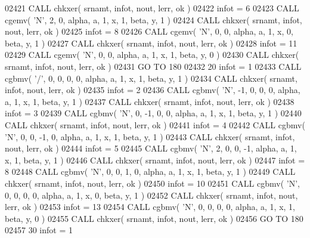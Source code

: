 \begin{DoxyCode}
02421       \textcolor{keyword}{CALL }chkxer( srnamt, infot, nout, lerr, ok )
02422       infot = 6
02423       \textcolor{keyword}{CALL }cgemv( \textcolor{stringliteral}{'N'}, 2, 0, alpha, a, 1, x, 1, beta, y, 1 )
02424       \textcolor{keyword}{CALL }chkxer( srnamt, infot, nout, lerr, ok )
02425       infot = 8
02426       \textcolor{keyword}{CALL }cgemv( \textcolor{stringliteral}{'N'}, 0, 0, alpha, a, 1, x, 0, beta, y, 1 )
02427       \textcolor{keyword}{CALL }chkxer( srnamt, infot, nout, lerr, ok )
02428       infot = 11
02429       \textcolor{keyword}{CALL }cgemv( \textcolor{stringliteral}{'N'}, 0, 0, alpha, a, 1, x, 1, beta, y, 0 )
02430       \textcolor{keyword}{CALL }chkxer( srnamt, infot, nout, lerr, ok )
02431       \textcolor{keywordflow}{GO TO} 180
02432    20 infot = 1
02433       \textcolor{keyword}{CALL }cgbmv( \textcolor{stringliteral}{'/'}, 0, 0, 0, 0, alpha, a, 1, x, 1, beta, y, 1 )
02434       \textcolor{keyword}{CALL }chkxer( srnamt, infot, nout, lerr, ok )
02435       infot = 2
02436       \textcolor{keyword}{CALL }cgbmv( \textcolor{stringliteral}{'N'}, -1, 0, 0, 0, alpha, a, 1, x, 1, beta, y, 1 )
02437       \textcolor{keyword}{CALL }chkxer( srnamt, infot, nout, lerr, ok )
02438       infot = 3
02439       \textcolor{keyword}{CALL }cgbmv( \textcolor{stringliteral}{'N'}, 0, -1, 0, 0, alpha, a, 1, x, 1, beta, y, 1 )
02440       \textcolor{keyword}{CALL }chkxer( srnamt, infot, nout, lerr, ok )
02441       infot = 4
02442       \textcolor{keyword}{CALL }cgbmv( \textcolor{stringliteral}{'N'}, 0, 0, -1, 0, alpha, a, 1, x, 1, beta, y, 1 )
02443       \textcolor{keyword}{CALL }chkxer( srnamt, infot, nout, lerr, ok )
02444       infot = 5
02445       \textcolor{keyword}{CALL }cgbmv( \textcolor{stringliteral}{'N'}, 2, 0, 0, -1, alpha, a, 1, x, 1, beta, y, 1 )
02446       \textcolor{keyword}{CALL }chkxer( srnamt, infot, nout, lerr, ok )
02447       infot = 8
02448       \textcolor{keyword}{CALL }cgbmv( \textcolor{stringliteral}{'N'}, 0, 0, 1, 0, alpha, a, 1, x, 1, beta, y, 1 )
02449       \textcolor{keyword}{CALL }chkxer( srnamt, infot, nout, lerr, ok )
02450       infot = 10
02451       \textcolor{keyword}{CALL }cgbmv( \textcolor{stringliteral}{'N'}, 0, 0, 0, 0, alpha, a, 1, x, 0, beta, y, 1 )
02452       \textcolor{keyword}{CALL }chkxer( srnamt, infot, nout, lerr, ok )
02453       infot = 13
02454       \textcolor{keyword}{CALL }cgbmv( \textcolor{stringliteral}{'N'}, 0, 0, 0, 0, alpha, a, 1, x, 1, beta, y, 0 )
02455       \textcolor{keyword}{CALL }chkxer( srnamt, infot, nout, lerr, ok )
02456       \textcolor{keywordflow}{GO TO} 180
02457    30 infot = 1

\end{DoxyCode}
